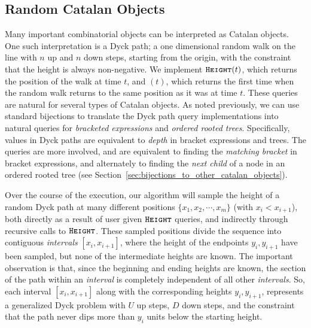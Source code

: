\subsection{Random Catalan Objects}
\label{sec:overview_catalan_objects}
Many important combinatorial objects can be interpreted as Catalan objects.
One such interpretation is a Dyck path; a one dimensional random walk on the line with $n$ up and $n$ down steps, starting from the origin,
with the constraint that the height is always non-negative.
We implement $\texttt{\textsc{Height}}(t)$, which returns the position of the walk at time $t$,
and $(t)$, which returns the first time when the random walk returns to the same position as it was at time $t$.
These queries are natural for several types of Catalan objects.
As noted previously, we can use standard bijections to translate the Dyck path query implementations into
natural queries for \emph{bracketed expressions} and \emph{ordered rooted trees}.
Specifically,  values in Dyck paths are equivalent to \emph{depth} in bracket expressions and trees.
The  queries are more involved, and are equivalent to finding the \emph{matching bracket} in bracket expressions,
and alternately to finding the \emph{next child} of a node in an ordered rooted tree (see Section~\ref{sec:bijections_to_other_catalan_objects}).

Over the course of the execution, our algorithm will sample the height of a random Dyck path at many different positions $\{ x_1, x_2,\cdots, x_m\}$
(with $x_i<x_{i+1}$), both directly as a result of user given $\texttt{\textsc{Height}}$ queries, and indirectly through recursive calls to $\texttt{\textsc{Height}}$.
These sampled positions divide the sequence into contiguous \emph{intervals} $[x_i,x_{i+1}]$,
where the height of the endpoints $y_i, y_{i+1}$ have been sampled, but none of the intermediate heights are known.
The important observation is that, since the beginning and ending heights are known,
the section of the path within an \emph{interval} is completely independent of all other \emph{intervals}.
So, each interval $[x_i,x_{i+1}]$ along with the corresponding heights $y_i,y_{i+1}$,
represents a generalized Dyck problem with $U$ up steps, $D$ down steps,
and the constraint that the path never dips more than $y_i$ units below the starting height.

